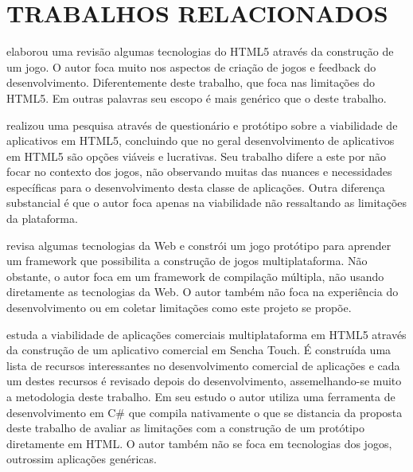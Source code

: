 
\section{TRABALHOS RELACIONADOS}
\citet{crossPlatformMobileGame} elaborou uma revisão algumas
tecnologias do HTML5 através da construção de um jogo. O autor foca
muito nos aspectos de criação de jogos e feedback do desenvolvimento.
Diferentemente deste trabalho, que foca nas limitações do HTML5. Em
outras palavras seu escopo é mais genérico que o deste trabalho.

\citet{aSeriousContender} realizou uma pesquisa através de questionário
e protótipo sobre a viabilidade de aplicativos em HTML5, concluindo que
no geral desenvolvimento de aplicativos em HTML5 são opções viáveis
e lucrativas. Seu trabalho difere a este por não focar no contexto dos
jogos, não observando muitas das nuances e necessidades específicas
para o desenvolvimento desta classe de aplicações. Outra diferença substancial é que o
autor foca apenas na viabilidade não ressaltando as limitações da
plataforma.

\citet{crossPlatformMobileGameDevelopment} revisa algumas tecnologias
da Web e constrói um jogo protótipo para aprender um framework que
possibilita a construção de jogos multiplataforma. Não obstante,
o autor foca em um framework de compilação múltipla, não usando
diretamente as tecnologias da Web. O autor também não foca na experiência do
desenvolvimento ou em coletar limitações como este projeto se propõe.

\citet{viabilityBusinessApplications} estuda a viabilidade de
aplicações comerciais multiplataforma em HTML5 através da
construção de um aplicativo comercial em Sencha Touch. É construída
uma lista de recursos interessantes no desenvolvimento comercial
de aplicações e cada um destes recursos é revisado depois do
desenvolvimento, assemelhando-se muito a metodologia deste trabalho. Em
seu estudo o autor utiliza uma ferramenta de desenvolvimento em C\# que
compila nativamente o que se distancia da proposta deste trabalho de
avaliar as limitações com a construção de um protótipo diretamente
em HTML. O autor também não se foca em tecnologias dos jogos,
outrossim aplicações genéricas.


